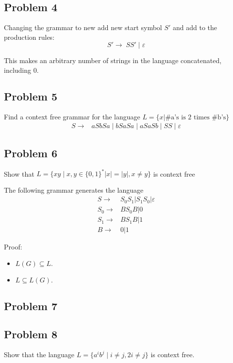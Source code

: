 \documentclass[english]{article}
\begin{document}
\subsection*{Problem 4}
Changing the grammar to new add new start symbol $S'$ and add to the production rules:
\[ S' \rightarrow \; SS' \; | \; \varepsilon \]

This makes an arbitrary number of strings in the language concatenated, including 0.

\subsection*{Problem 5}
Find a context free grammar for the language \(L = \{ x | \textrm{\#a's is 2 times \#b's}\}\)
\begin{align*}
S \rightarrow & aSbSa \;|\; bSaSa \;|\; aSaSb \;|\; SS \;|\; \varepsilon
\end{align*}


\subsection*{Problem 6}
Show that \(L = \{ xy \mid x,y \in \{0,1\}^* |x| = |y|, x \neq y \}\) is context free

The following grammar generates the language
\begin{align*}
S \rightarrow & S_0 S_1 | S_1 S_0 | \varepsilon \\
S_0 \rightarrow & B S_0 B | 0 \\
S_1 \rightarrow & B S_1 B | 1 \\
B \rightarrow & 0 | 1
\end{align*}

Proof:
\begin{itemize}
\item \(L(G) \subseteq L\). 
\item \(L \subseteq L(G)\). 
\end{itemize}

\subsection*{Problem 7}

\subsection*{Problem 8}
Show that the language \(L = \{a^i b^j \mid i \neq j, 2i \neq j\}\) is context free.
\end{document}
